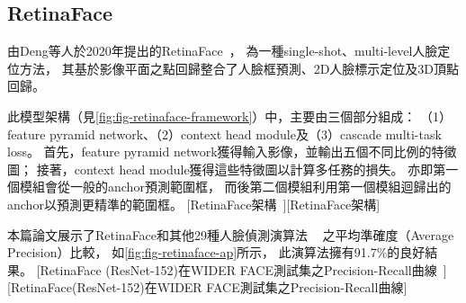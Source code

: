 \documentclass[class=NCU_thesis, crop=false]{standalone}
\begin{document}
\subsection{RetinaFace}
由Deng等人於2020年提出的RetinaFace~\cite{deng_retinaface_2020}，
為一種single-shot、multi-level人臉定位方法，
其基於影像平面之點回歸整合了人臉框預測、2D人臉標示定位及3D頂點回歸。

此模型架構（見\cref{fig:fig-retinaface-framework}）中，主要由三個部分組成：
（1）feature pyramid network、（2）context head module及（3）cascade multi-task loss。
首先，feature pyramid network獲得輸入影像，並輸出五個不同比例的特徵圖；
接著，context head module獲得這些特徵圖以計算多任務的損失。
亦即第一個模組會從一般的anchor預測範圍框，
而後第二個模組利用第一個模組迴歸出的anchor以預測更精準的範圍框。
[RetinaFace架構~\cite{deng_retinaface_2020}][RetinaFace架構]

本篇論文展示了RetinaFace和其他29種人臉偵測演算法
~\cite{zhang_single-shot_2019, tang_pyramidbox_2018, najibi_ssh_2017, zhang_s3fd_2017, li_dsfd_2019}
之平均準確度（Average Precision）比較，
如\cref{fig:fig-retinaface-ap}所示，
此演算法擁有91.7\%的良好結果。
[RetinaFace (ResNet-152)在WIDER FACE測試集之Precision-Recall曲線~\cite{deng_retinaface_2020}][RetinaFace(ResNet-152)在WIDER FACE測試集之Precision-Recall曲線]
\end{document}

